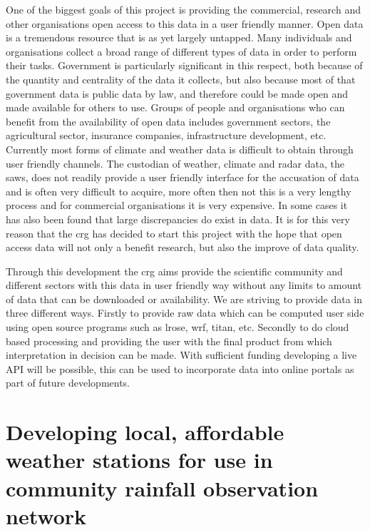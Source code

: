 \documentclass{wrcreport}
\begin{document}
One of the biggest goals of this project is providing the commercial,
research and other organisations open access to this data in a user
friendly manner. Open data is a tremendous resource that is as yet
largely untapped. Many individuals and organisations collect a broad
range of different types of data in order to perform their tasks.
Government is particularly significant in this respect, both because
of the quantity and centrality of the data it collects, but also
because most of that government data is public data by law, and
therefore could be made open and made available for others to use.
Groups of people and organisations who can benefit from the
availability of open data includes government sectors, the
agricultural sector, insurance companies, infrastructure development,
etc. Currently most forms of climate and weather data is difficult to
obtain through user friendly channels. The custodian of weather,
climate and radar data, the \gls{saws}, does not readily provide a
user friendly interface for the accusation of data and is often very
difficult to acquire, more often then not this is a very lengthy
process and for commercial organisations it is very expensive. In some
cases it has also been found that large discrepancies do exist in
data. It is for this very reason that the \gls{crg} has decided to
start this project with the hope that open access data will not only a
benefit research, but also the improve of data quality.

Through this development the \gls{crg} aims provide the scientific
community and different sectors with this data in user friendly way
without any limits to amount of data that can be downloaded or
availability. We are striving to provide data in three different ways.
Firstly to provide raw data which can be computed user side using open
source programs such as \gls{lrose}, \gls{wrf}, titan, etc. Secondly
to do cloud based processing and providing the user with the final
product from which interpretation in decision can be made. With
sufficient funding developing a live API will be possible, this can be
used to incorporate  data into online portals as part of future
developments.

\section{Developing local, affordable weather stations for use in community rainfall observation network}
\end{document}
